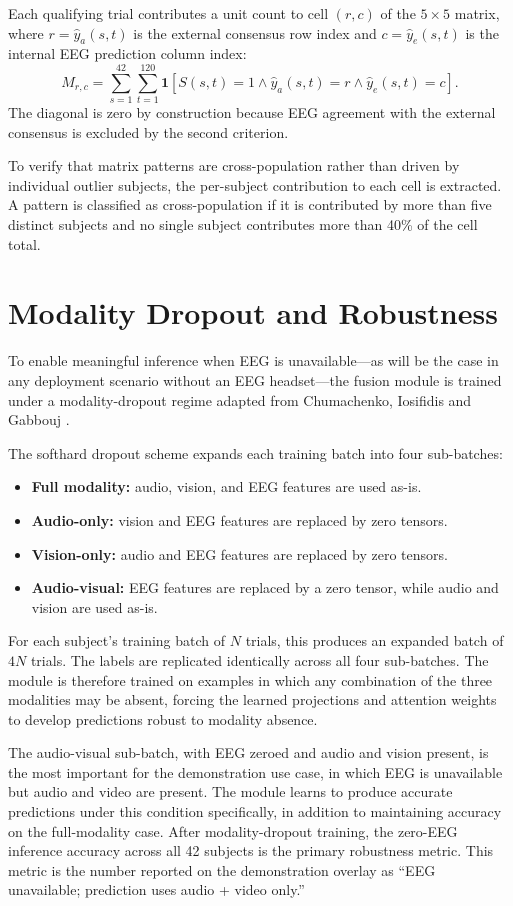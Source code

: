 Each qualifying trial contributes a unit count to cell $(r,c)$ of the $5\times5$ matrix, where $r=\hat{y}_{a}(s,t)$ is the external consensus row index and $c=\hat{y}_{e}(s,t)$ is the internal EEG prediction column index:
\begin{equation}
    M_{r,c}=\sum_{s=1}^{42}\sum_{t=1}^{120}\mathbf{1}\left[S(s,t)=1 \land \hat{y}_{a}(s,t)=r \land \hat{y}_{e}(s,t)=c\right].
\end{equation}
The diagonal is zero by construction because EEG agreement with the external consensus is excluded by the second criterion.

To verify that matrix patterns are cross-population rather than driven by individual outlier subjects, the per-subject contribution to each cell is extracted. A pattern is classified as cross-population if it is contributed by more than five distinct subjects and no single subject contributes more than 40\% of the cell total.

\section{Modality Dropout and Robustness}
\label{sec:modality_dropout}
To enable meaningful inference when EEG is unavailable---as will be the case in any deployment scenario without an EEG headset---the fusion module is trained under a modality-dropout regime adapted from Chumachenko, Iosifidis and Gabbouj \cite{Chumachenko2022SelfAttention}.

The softhard dropout scheme expands each training batch into four sub-batches:
\begin{itemize}
    \item \textbf{Full modality:} audio, vision, and EEG features are used as-is.
    \item \textbf{Audio-only:} vision and EEG features are replaced by zero tensors.
    \item \textbf{Vision-only:} audio and EEG features are replaced by zero tensors.
    \item \textbf{Audio-visual:} EEG features are replaced by a zero tensor, while audio and vision are used as-is.
\end{itemize}
For each subject's training batch of $N$ trials, this produces an expanded batch of $4N$ trials. The labels are replicated identically across all four sub-batches. The module is therefore trained on examples in which any combination of the three modalities may be absent, forcing the learned projections and attention weights to develop predictions robust to modality absence.

The audio-visual sub-batch, with EEG zeroed and audio and vision present, is the most important for the demonstration use case, in which EEG is unavailable but audio and video are present. The module learns to produce accurate predictions under this condition specifically, in addition to maintaining accuracy on the full-modality case. After modality-dropout training, the zero-EEG inference accuracy across all 42 subjects is the primary robustness metric. This metric is the number reported on the demonstration overlay as ``EEG unavailable; prediction uses audio + video only.''